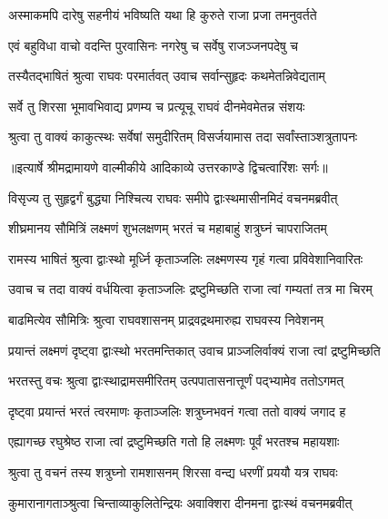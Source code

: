 \twolineshloka
{अस्माकमपि दारेषु सहनीयं भविष्यति}
{यथा हि कुरुते राजा प्रजा तमनुवर्तते} %

\twolineshloka
{एवं बहुविधा वाचो वदन्ति पुरवासिनः}
{नगरेषु च सर्वेषु राजञ्जनपदेषु च} %

\twolineshloka
{तस्यैतद्भाषितं श्रुत्वा राघवः परमार्तवत्}
{उवाच सर्वान्सुहृदः कथमेतन्निवेद्यताम्} %

\twolineshloka
{सर्वे तु शिरसा भूमावभिवाद्य प्रणम्य च}
{प्रत्यूचू राघवं दीनमेवमेतन्न संशयः} %

\twolineshloka
{श्रुत्वा तु वाक्यं काकुत्स्थः सर्वेषां समुदीरितम्}
{विसर्जयामास तदा सर्वांस्ताञ्शत्रुतापनः} %


{॥इत्यार्षे श्रीमद्रामायणे वाल्मीकीये आदिकाव्ये उत्तरकाण्डे द्विचत्वारिंशः सर्गः॥}


\twolineshloka
{विसृज्य तु सुहृद्वर्गं बुद्ध्या निश्चित्य राघवः}
{समीपे द्वाःस्थमासीनमिदं वचनमब्रवीत्} %

\twolineshloka
{शीघ्रमानय सौमित्रिं लक्ष्मणं शुभलक्षणम्}
{भरतं च महाबाहुं शत्रुघ्नं चापराजितम्} %

\twolineshloka
{रामस्य भाषितं श्रुत्वा द्वाःस्थो मूर्ध्नि कृताञ्जलिः}
{लक्ष्मणस्य गृहं गत्वा प्रविवेशानिवारितः} %

\twolineshloka
{उवाच च तदा वाक्यं वर्धयित्वा कृताञ्जलिः}
{द्रष्टुमिच्छति राजा त्वां गम्यतां तत्र मा चिरम्} %

\twolineshloka
{बाढमित्येव सौमित्रिः श्रुत्वा राघवशासनम्}
{प्राद्रवद्रथमारुह्य राघवस्य निवेशनम्} %

\twolineshloka
{प्रयान्तं लक्ष्मणं दृष्ट्वा द्वाःस्थो भरतमन्तिकात्}
{उवाच प्राञ्जलिर्वाक्यं राजा त्वां द्रष्टुमिच्छति} %

\twolineshloka
{भरतस्तु वचः श्रुत्वा द्वाःस्थाद्रामसमीरितम्}
{उत्पपातासनात्तूर्णं पद्भ्यामेव ततोऽगमत्} %

\twolineshloka
{दृष्ट्वा प्रयान्तं भरतं त्वरमाणः कृताञ्जलिः}
{शत्रुघ्नभवनं गत्वा ततो वाक्यं जगाद ह} %

\twolineshloka
{एह्यागच्छ रघुश्रेष्ठ राजा त्वां द्रष्टुमिच्छति}
{गतो हि लक्ष्मणः पूर्वं भरतश्च महायशाः} %

\twolineshloka
{श्रुत्वा तु वचनं तस्य शत्रुघ्नो रामशासनम्}
{शिरसा वन्द्य धरणीं प्रययौ यत्र राघवः} %

\twolineshloka
{कुमारानागताञ्श्रुत्वा चिन्ताव्याकुलितेन्द्रियः}
{अवाक्शिरा दीनमना द्वाःस्थं वचनमब्रवीत्} %

